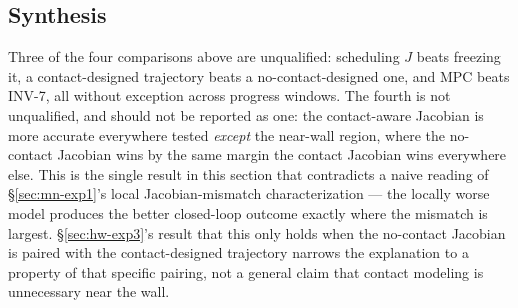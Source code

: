\documentclass[journal]{IEEEtran}
\begin{document}
\subsection{Synthesis}
\label{sec:hw-synthesis}

Three of the four comparisons above are unqualified: scheduling $J$
beats freezing it, a contact-designed trajectory beats a no-contact-designed
one, and MPC beats INV-7, all without exception across progress
windows. The fourth is not unqualified, and should not be reported as
one: the contact-aware Jacobian is more accurate everywhere tested
\emph{except} the near-wall region, where the no-contact Jacobian wins
by the same margin the contact Jacobian wins everywhere else. This is
the single result in this section that contradicts a naive reading of
\S\ref{sec:mn-exp1}'s local Jacobian-mismatch characterization --- the
locally worse model produces the better closed-loop outcome exactly
where the mismatch is largest. \S\ref{sec:hw-exp3}'s result that this
only holds when the no-contact Jacobian is paired with the
contact-designed trajectory narrows the explanation to a property of
that specific pairing, not a general claim that contact modeling is
unnecessary near the wall.
\end{document}
